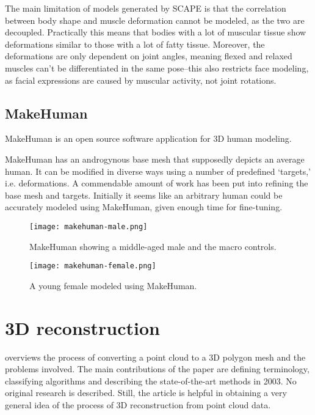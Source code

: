 The main limitation of models generated by SCAPE is that the correlation between body shape and muscle deformation cannot be modeled, as the two are decoupled. Practically this means that bodies with a lot of muscular tissue show deformations similar to those with a lot of fatty tissue. Moreover, the deformations are only dependent on joint angles, meaning flexed and relaxed muscles can't be differentiated in the same pose--this also restricts face modeling, as facial expressions are caused by muscular activity, not joint rotations. \citep{anguelov2005scape}

\citep{baek2012parametric}


\subsection{MakeHuman}


MakeHuman \citep{makehuman} is an open source software application for 3D human modeling.

MakeHuman has an androgynous base mesh that supposedly depicts an average human. It can be modified in diverse ways using a number of predefined `targets,' i.e. deformations. A commendable amount of work has been put into refining the base mesh and targets. Initially it seems like an arbitrary human could be accurately modeled using MakeHuman, given enough time for fine-tuning.

\begin{figure}
    \centering
    \texttt{[image: makehuman-male.png]}
    \caption{MakeHuman showing a middle-aged male and the macro controls.}
    \label{fig:makehuman-male}
\end{figure}

\begin{figure}
    \centering
    \texttt{[image: makehuman-female.png]}
    \caption{A young female modeled using MakeHuman.}
    \label{fig:makehuman-female}
\end{figure}

\section{3D reconstruction}

\citet{fabio2003point} overviews the process of converting a point cloud to a 3D polygon mesh and the problems involved. The main contributions of the paper are defining terminology, classifying algorithms and describing the state-of-the-art methods in 2003. No original research is described. Still, the article is helpful in obtaining a very general idea of the process of 3D reconstruction from point cloud data.

